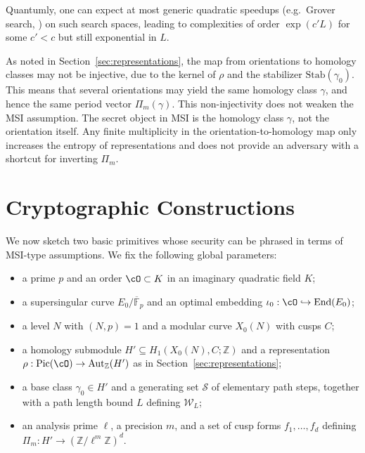 \documentclass[10pt]{amsart}
\theoremstyle{theostyle}
\newcommand{\FF}{\mathbb{F}} \newcommand{\HH}{\mathbb{H}}
\newcommand{\ZZ}{\mathbb{Z}}
\newcommand{\End}{\mathrm{End}}
\newcommand{\Aut}{\mathrm{Aut}}
\newcommand{\Pic}{\mathrm{Pic}}
\newcommand{\Stab}{\mathrm{Stab}}
\begin{document}
Quantumly, one can expect at most generic quadratic speedups (e.g.\ Grover
search, \cite{Grover:Quantum}) on such search spaces, leading to complexities of order
$\exp(c'L)$ for some $c'<c$ but still exponential in $L$.


As noted in Section~\ref{sec:representations}, the map from orientations to homology classes may not be injective, due to the kernel
of $\rho$ and the stabilizer $\Stab(\gamma_0)$. This means that several
orientations may yield the same homology class $\gamma$, and hence the same
period vector $\Pi_m(\gamma)$. 
This non-injectivity does not weaken the MSI assumption. The secret
object in MSI is the homology class $\gamma$, not the orientation itself. Any
finite multiplicity in the orientation-to-homology map only increases the
entropy of representations and does not provide an adversary with a shortcut
for inverting $\Pi_m$.



\section{Cryptographic Constructions}
\label{sec:crypto-construct}

We now sketch two basic primitives whose security can be phrased in terms
of MSI-type assumptions. We fix the following global parameters:

\begin{itemize}[leftmargin=1.7em]
	\item a prime $p$ and an order $\cO\subset K$ in an
	imaginary quadratic field $K$;
	\item a supersingular curve $E_0/\overline{\FF}_{p}$ and an
	optimal embedding $\iota_0:\cO\hookrightarrow\End(E_0)$;
	\item a level $N$ with $(N,p)=1$ and a modular curve
	$X_0(N)$ with cusps $C$;
	\item a homology submodule $H'\subseteq H_1(X_0(N),C;\ZZ)$ and a
	representation $\rho:\Pic(\cO)\to\Aut_\ZZ(H')$ as in
	Section~\ref{sec:representations};
	\item a base class $\gamma_0\in H'$ and a generating set $\mathcal S$ of
	elementary path steps, together with a path length bound $L$ defining
	$\mathcal W_L$;
	\item an analysis prime $\ell$, a precision $m$, and a set of cusp forms
	$f_1,\dots,f_d$ defining $\Pi_m:H'\to(\ZZ/\ell^m\ZZ)^d$.
\end{itemize}
\end{document}
